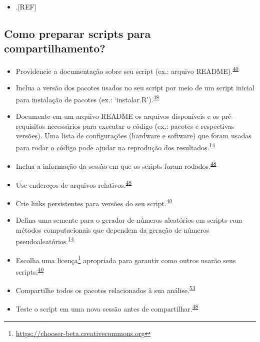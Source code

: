 \documentclass[
  a4paper,
]{book}
\providecommand{\tightlist}{%
  \setlength{\itemsep}{0pt}\setlength{\parskip}{0pt}}
\renewcommand{\href}[2]{#2\footnote{\url{#1}}}
\begin{document}
\begin{itemize}
\tightlist
\item
  .{[}REF{]}
\end{itemize}

\hypertarget{como-preparar-scripts-para-compartilhamento}{%
\subsection{Como preparar scripts para compartilhamento?}\label{como-preparar-scripts-para-compartilhamento}}

\begin{itemize}
\item
  Providencie a documentação sobre seu script (ex.: arquivo README).\textsuperscript{\protect\hyperlink{ref-Eglen2017}{40}}
\item
  Inclua a versão dos pacotes usados no seu script por meio de um script inicial para instalação de pacotes (ex.: `instalar.R').\textsuperscript{\protect\hyperlink{ref-trisovic2022}{48}}
\item
  Documente em um arquivo README os arquivos disponíveis e os pré-requisitos necessários para executar o código (ex.: pacotes e respectivas versões). Uma lista de configurações (hardware e software) que foram usadas para rodar o código pode ajudar na reprodução dos resultados.\textsuperscript{\protect\hyperlink{ref-hofner2015}{14}}
\item
  Inclua a informação da sessão em que os scripts foram rodados.\textsuperscript{\protect\hyperlink{ref-trisovic2022}{48}}
\item
  Use endereços de arquivos relativos.\textsuperscript{\protect\hyperlink{ref-trisovic2022}{48}}
\item
  Crie links persistentes para versões do seu script.\textsuperscript{\protect\hyperlink{ref-Eglen2017}{40}}
\item
  Defina uma semente para o gerador de números aleatórios em scripts com métodos computacionais que dependem da geração de números pseudoaleatórios.\textsuperscript{\protect\hyperlink{ref-hofner2015}{14}}
\item
  Escolha uma \href{https://chooser-beta.creativecommons.org}{licença} apropriada para garantir como outros usarão seus scripts.\textsuperscript{\protect\hyperlink{ref-Eglen2017}{40}}
\item
  Compartilhe todos os pacotes relacionados à sua análise.\textsuperscript{\protect\hyperlink{ref-Zhao2023}{53}}
\item
  Teste o script em uma nova sessão antes de compartilhar.\textsuperscript{\protect\hyperlink{ref-trisovic2022}{48}}
\end{itemize}
\end{document}
